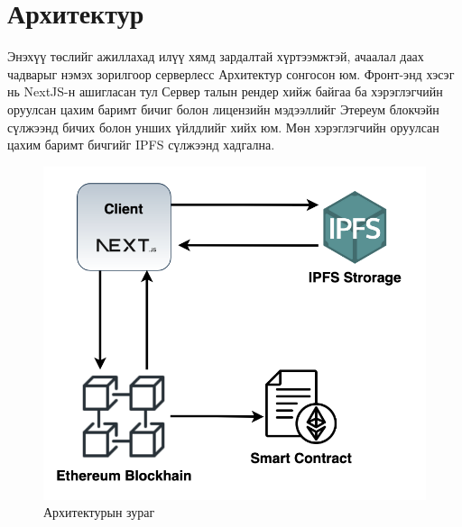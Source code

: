 \newpage
\section{Архитектур}
Энэхүү төслийг ажиллахад илүү хямд зардалтай хүртээмжтэй, ачаалал даах чадварыг
нэмэх зорилгоор серверлесс Архитектур сонгосон юм. Фронт-энд хэсэг нь NextJS-н ашигласан тул Сервер талын рендер хийж байгаа ба хэрэглэгчийн оруулсан цахим баримт бичиг болон лицензийн мэдээллийг Этереум блокчэйн сүлжээнд бичих болон унших үйлдлийг хийх юм. Мөн хэрэглэгчийн оруулсан цахим баримт бичгийг IPFS сүлжээнд хадгална.

\begin{figure}[h!]
	\centering
	\includegraphics[scale=0.4]{src/images/architecture.png}
	\caption{Архитектурын зураг}
\end{figure}
